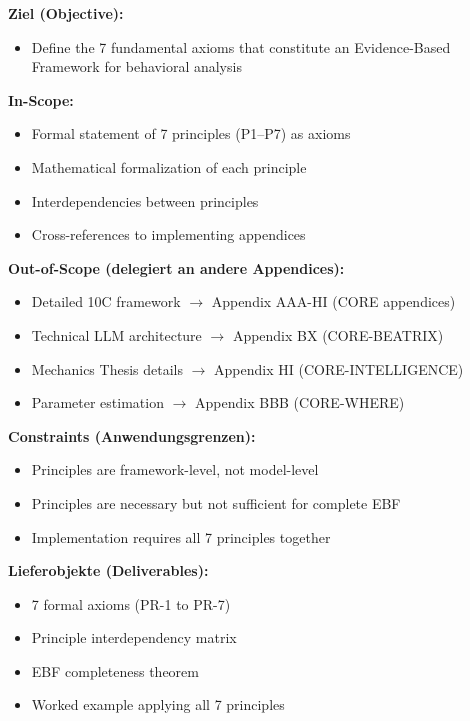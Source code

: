 \begin{tcolorbox}[
    colback=orange!5!white,
    colframe=orange!75!black,
    title={\textbf{Appendix Scope: Ziel / In-Scope / Out-of-Scope / Constraints}},
    fonttitle=\bfseries
]

\textbf{Ziel (Objective):}
\begin{itemize}[nosep]
    \item Define the 7 fundamental axioms that constitute an Evidence-Based Framework for behavioral analysis
\end{itemize}

\textbf{In-Scope:}
\begin{itemize}[nosep]
    \item Formal statement of 7 principles (P1--P7) as axioms
    \item Mathematical formalization of each principle
    \item Interdependencies between principles
    \item Cross-references to implementing appendices
\end{itemize}

\textbf{Out-of-Scope (delegiert an andere Appendices):}
\begin{itemize}[nosep]
    \item Detailed 10C framework $\rightarrow$ Appendix AAA-HI (CORE appendices)
    \item Technical LLM architecture $\rightarrow$ Appendix BX (CORE-BEATRIX)
    \item Mechanics Thesis details $\rightarrow$ Appendix HI (CORE-INTELLIGENCE)
    \item Parameter estimation $\rightarrow$ Appendix BBB (CORE-WHERE)
\end{itemize}

\textbf{Constraints (Anwendungsgrenzen):}
\begin{itemize}[nosep]
    \item Principles are framework-level, not model-level
    \item Principles are necessary but not sufficient for complete EBF
    \item Implementation requires all 7 principles together
\end{itemize}

\textbf{Lieferobjekte (Deliverables):}
\begin{itemize}[nosep]
    \item 7 formal axioms (PR-1 to PR-7)
    \item Principle interdependency matrix
    \item EBF completeness theorem
    \item Worked example applying all 7 principles
\end{itemize}

\end{tcolorbox}


